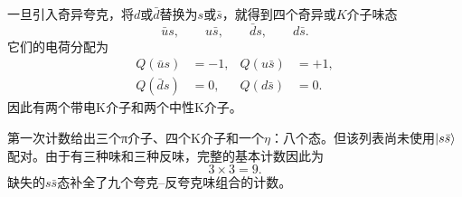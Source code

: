 \begin{classroomqa}
\end{classroomqa}

\begin{classroomqa}
\end{classroomqa}

一旦引入奇异夸克，将\(d\)或\(\bar d\)替换为\(s\)或\(\bar s\)，就得到四个奇异或\(K\)介子味态
\begin{equation}
\bar u s,\qquad u\bar s,\qquad \bar d s,\qquad d\bar s.
\end{equation}
它们的电荷分配为
\begin{align}
Q(\bar u s) &=-1,
&
Q(u\bar s) &=+1,
\\
Q(\bar d s) &=0,
&
Q(d\bar s) &=0.
\end{align}
因此有两个带电K介子和两个中性K介子。

第一次计数给出三个{\proseunicodefont π}介子、四个K介子和一个\(\eta\)：八个态。但该列表尚未使用\(\left\lvert s\bar s\right\rangle\)配对。由于有三种味和三种反味，完整的基本计数因此为
\begin{equation}
3\times3=9.
\end{equation}
缺失的\(s\bar s\)态补全了九个夸克--反夸克味组合的计数。
